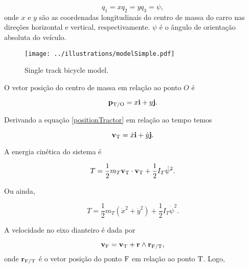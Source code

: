 \documentclass[sublist]{fei}
\begin{document}
\begin{subequations}
\begin{equation}
    q_1 = x
\end{equation}
\begin{equation}
    q_2 = y
\end{equation}
\begin{equation}
    q_3 = \psi,
\end{equation}
\end{subequations}
onde \(x\) e \(y\) são as coordenadas longitudinais do centro de massa do carro nas direções horizontal e vertical, respectivamente. \(\psi\) é o ângulo de orientação absoluta do veículo.

\begin{figure}
    \begin{center}
    \texttt{[image: ../illustrations/modelSimple.pdf]}
    \caption{Single track bicycle model.} \label{modelSimple}
    \end{center}
\end{figure}

O vetor posição do centro de massa em relação ao ponto \(O\) é

\begin{equation} \label{positionTractor}
    {\bf p}_{{\rm T}/{\rm O}} = x {\bf i} + y {\bf j}.
\end{equation}

Derivando a equação \eqref{positionTractor} em relação ao tempo temos

\begin{equation}
    {\bf v}_{\rm T} = \dot{x} {\bf i} + \dot{y} {\bf j}.
\end{equation}

A energia cinética do sistema é

\begin{equation}
    T = \frac{1}{2} m_{T} {\bf v}_{\rm T} \cdot {\bf v}_{\rm T} + \frac{1}{2} I_{T} \dot{\psi}^2.
\end{equation}

Ou ainda,

\begin{equation}
    T = \frac{1}{2} m_{T} \left( \dot{x}^2 + \dot{y}^2 \right) + \frac{1}{2} I_{T} \dot{\psi}^2.
\end{equation}

A velocidade no eixo dianteiro é dada por

\begin{equation}
    {\bf v}_{\rm F} = {\bf v}_{\rm T} + {\bf r} \wedge {\bf r}_{{\rm F}/{\rm T}},
\end{equation}
onde \({\bf r}_{{\rm F}/{\rm T}}\) é o vetor posição do ponto \({\rm F}\) em relação ao ponto \({\rm T}\). Logo,
\end{document}
